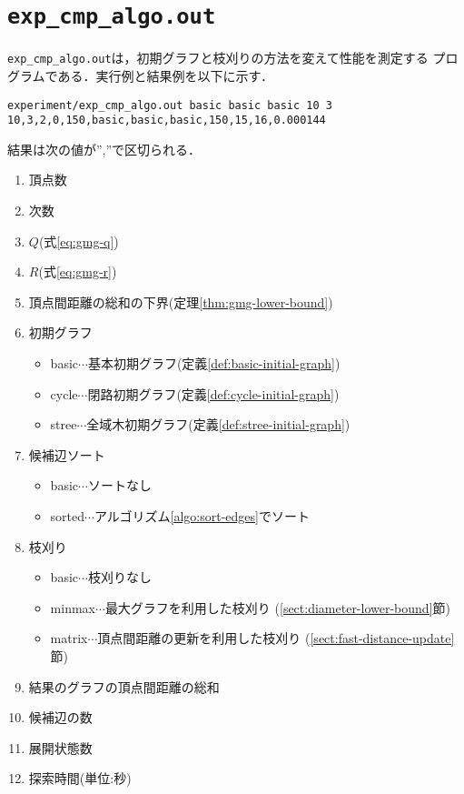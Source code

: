 \section*{\texttt{exp\_cmp\_algo.out}}
\texttt{exp\_cmp\_algo.out}は，初期グラフと枝刈りの方法を変えて性能を測定する
プログラムである．実行例と結果例を以下に示す．
\begin{verbatim}
experiment/exp_cmp_algo.out basic basic basic 10 3
10,3,2,0,150,basic,basic,basic,150,15,16,0.000144
\end{verbatim}
結果は次の値が'',''で区切られる．
\begin{enumerate}
\item 頂点数
\item 次数
\item $Q$(式\ref{eq:gmg-q})
\item $R$(式\ref{eq:gmg-r})
\item 頂点間距離の総和の下界(定理\ref{thm:gmg-lower-bound})
\item 初期グラフ
  \begin{itemize}
  \item basic$\cdots$基本初期グラフ(定義\ref{def:basic-initial-graph})
  \item cycle$\cdots$閉路初期グラフ(定義\ref{def:cycle-initial-graph})
  \item stree$\cdots$全域木初期グラフ(定義\ref{def:stree-initial-graph})
  \end{itemize}
\item 候補辺ソート
  \begin{itemize}
  \item basic$\cdots$ソートなし
  \item sorted$\cdots$アルゴリズム\ref{algo:sort-edges}でソート
  \end{itemize}
\item 枝刈り
  \begin{itemize}
  \item basic$\cdots$枝刈りなし
  \item minmax$\cdots$最大グラフを利用した枝刈り
    (\ref{sect:diameter-lower-bound}節)
  \item matrix$\cdots$頂点間距離の更新を利用した枝刈り
    (\ref{sect:fast-distance-update}節)
  \end{itemize}
\item 結果のグラフの頂点間距離の総和
\item 候補辺の数
\item 展開状態数
\item 探索時間(単位:秒)
\end{enumerate}

